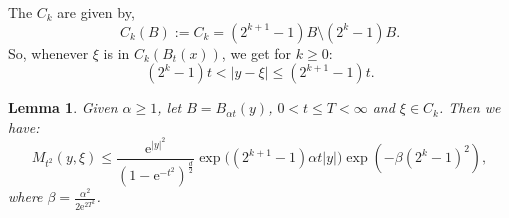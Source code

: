 \documentclass[a4paper,oneside,10pt]{amsproc}
\newtheorem{lemma}{Lemma}
\theoremstyle{remark}
\renewcommand{\leq}{\leqslant}
\renewcommand{\leq}{\leqslant}
\renewcommand{\geq}{\geqslant}
\newcommand{\e}{\mathrm{e}} %
\renewcommand{\leq}{\leqslant}%
\renewcommand{\geq}{\geqslant}%
\begin{document}
The $C_k$ are given by,
\begin{equation}
  \label{eq:C_k-annulus-decomposition}
  C_k(B) := C_k = (2^{k + 1} - 1)B \setminus (2^k - 1)B.
\end{equation}
So, whenever $\xi$ is in $C_k(B_t(x))$, we get for $k \geq 0$:
\begin{equation}
  \label{eq:C_k-annulus-decomposition-expand}
  (2^k - 1) t < |y - \xi| \leq (2^{k + 1} - 1) t.
\end{equation}

\begin{lemma}\label{lem:On-diagonal-kernel-estimates-on-Ck}
  Given $\alpha \geq 1$, let $B = B_{\alpha t}(y)$, $0 < t \leq T < \infty$
  and $\xi \in C_k$. Then we have:
  \begin{equation*}
    M_{t^2}(y, \xi) \leq \frac{\e^{|y|^2}}{(1 - \e^{-{t^2}})^{\frac{d}2}}
    \exp\bigl((2^{k + 1} - 1) \alpha t |y| \bigr) \exp(- \beta (2^k - 1)^2 ),
  \end{equation*}
  where $\beta = \frac{\alpha^2}{2 \e^{2T^2}}$.
\end{lemma}
\end{document}
